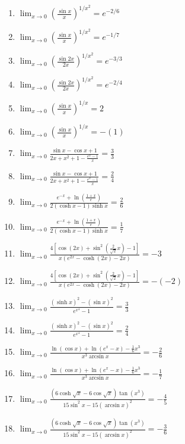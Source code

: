 \documentclass[11pt,a4paper]{article}
\begin{document}
\begin{enumerate}
\item $\displaystyle \lim_{x \to 0} \left(\frac{\sin x}{x}\right)^{1/x^{2}} = e^{-2/6}$
\item $\displaystyle \lim_{x \to 0} \left(\frac{\sin x}{x}\right)^{1/x^{2}} = e^{-1/7}$
\item $\displaystyle \lim_{x \to 0} \left(\frac{\sin 2x}{2x}\right)^{1/x^{2}} = e^{-3/3}$
\item $\displaystyle \lim_{x \to 0} \left(\frac{\sin 2x}{2x}\right)^{1/x^{2}} = e^{-2/4}$
\item $\displaystyle \lim_{x \to 0} \left(\frac{\sin x}{x}\right)^{1/x} = 2$
\item $\displaystyle \lim_{x \to 0} \left(\frac{\sin x}{x}\right)^{1/x} = -\left(1\right)$
\item $\displaystyle \lim_{x \to 0} \frac{\sin x - \cos x + 1}{2x + x^{2} + 1 - \frac{e^{x} - 1}{x}} = \frac{3}{3}$
\item $\displaystyle \lim_{x \to 0} \frac{\sin x - \cos x + 1}{2x + x^{2} + 1 - \frac{e^{x} - 1}{x}} = \frac{2}{4}$
\item $\displaystyle \lim_{x \to 0} \frac{e^{-x} + \ln\left(\frac{1 + x}{e}\right)}{2(\cosh x - 1)\sinh x} = \frac{2}{6}$
\item $\displaystyle \lim_{x \to 0} \frac{e^{-x} + \ln\left(\frac{1 + x}{e}\right)}{2(\cosh x - 1)\sinh x} = \frac{1}{7}$
\item $\displaystyle \lim_{x \to 0} \frac{4\left[\cos(2x) + \sin^{2}\left(\frac{2}{\sqrt{2}}x\right) - 1\right]}{x\left(e^{2x} - \cosh(2x) - 2x\right)} = -3$
\item $\displaystyle \lim_{x \to 0} \frac{4\left[\cos(2x) + \sin^{2}\left(\frac{2}{\sqrt{2}}x\right) - 1\right]}{x\left(e^{2x} - \cosh(2x) - 2x\right)} = -\left(-2\right)$
\item $\displaystyle \lim_{x \to 0} \frac{(\sinh x)^{2} - (\sin x)^{2}}{e^{x^{4}} - 1} = \frac{3}{3}$
\item $\displaystyle \lim_{x \to 0} \frac{(\sinh x)^{2} - (\sin x)^{2}}{e^{x^{4}} - 1} = \frac{2}{4}$
\item $\displaystyle \lim_{x \to 0} \frac{\ln(\cos x) + \ln(e^{x} - x) - \frac{1}{6}x^{3}}{x^{3}\arcsin x} = -\frac{2}{6}$
\item $\displaystyle \lim_{x \to 0} \frac{\ln(\cos x) + \ln(e^{x} - x) - \frac{1}{6}x^{3}}{x^{3}\arcsin x} = -\frac{1}{7}$
\item $\displaystyle \lim_{x \to 0} \frac{(6\cosh\sqrt{x} - 6\cos\sqrt{x})\tan(x^{3})}{15\sin^{2} x - 15(\arcsin x)^{2}} = -\frac{4}{5}$
\item $\displaystyle \lim_{x \to 0} \frac{(6\cosh\sqrt{x} - 6\cos\sqrt{x})\tan(x^{3})}{15\sin^{2} x - 15(\arcsin x)^{2}} = -\frac{3}{6}$

\end{enumerate}
\end{document}
